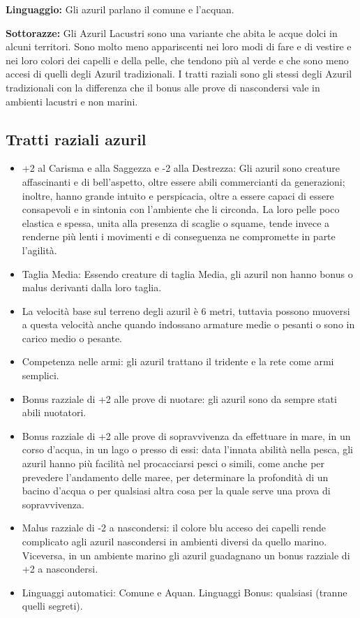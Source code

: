 \documentclass[10pt, a4paper]{report}
\begin{document}
\begin{multicols}{2}
\textbf{Linguaggio:} Gli azuril parlano il comune e l'acquan. 

\textbf{Sottorazze:} Gli Azuril Lacustri sono una variante che abita le acque dolci in alcuni territori. Sono molto meno appariscenti nei loro modi di fare e di vestire e nei loro colori dei capelli e della pelle, che tendono più al verde e che sono meno accesi di quelli degli Azuril tradizionali. I tratti raziali sono gli stessi degli Azuril tradizionali con la differenza che il bonus alle prove di nascondersi vale in ambienti lacustri e non marini.

\subsection*{Tratti raziali azuril}
\begin{itemize}
	\item +2 al Carisma e alla Saggezza e -2 alla Destrezza: Gli azuril sono creature affascinanti e di bell’aspetto, oltre essere abili commercianti da generazioni; inoltre, hanno grande intuito e perspicacia, oltre a essere capaci di essere consapevoli e in sintonia con l’ambiente che li circonda. La loro pelle poco elastica e spessa, unita alla presenza di scaglie o squame, tende invece a renderne più lenti i movimenti e di conseguenza ne compromette in parte l’agilità.
	\item Taglia Media: Essendo creature di taglia Media, gli azuril non hanno bonus o malus derivanti dalla loro taglia.
	\item La velocità base sul terreno degli azuril è 6 metri, tuttavia possono muoversi a questa velocità anche quando indossano armature medie o pesanti o sono in carico medio o pesante.
	\item Competenza nelle armi: gli azuril trattano il tridente e la rete come armi semplici.
	\item Bonus razziale di +2 alle prove di nuotare: gli azuril sono da sempre stati abili nuotatori.
	\item Bonus razziale di +2 alle prove di sopravvivenza da effettuare in mare, in un corso d’acqua, in un lago o presso di essi: data l’innata abilità nella pesca, gli azuril hanno più facilità nel procacciarsi pesci o simili, come anche per prevedere l’andamento delle maree, per determinare la profondità di un bacino d’acqua o per qualsiasi altra cosa per la quale serve una prova di sopravvivenza.
	\item Malus razziale di -2 a nascondersi: il colore blu acceso dei capelli rende complicato agli azuril nascondersi in ambienti diversi da quello marino. Viceversa, in un ambiente marino gli azuril guadagnano un bonus razziale di +2 a nascondersi.             
	\item Linguaggi automatici: Comune e Aquan. Linguaggi Bonus: qualsiasi (tranne quelli segreti).

\end{itemize}

\end{multicols}
\end{document}

